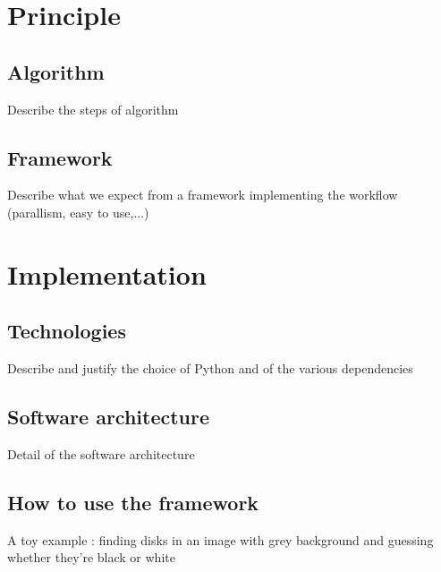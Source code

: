 \section{Principle}
\subsection{Algorithm}
Describe the steps of algorithm  
\subsection{Framework}
Describe what we expect from a framework implementing the workflow (parallism, easy to use,...) 
\section{Implementation}
\subsection{Technologies}
Describe and justify the choice of Python and of the various dependencies
\subsection{Software architecture}
Detail of the software architecture
\subsection{How to use the framework}
A toy example : finding disks in an image with grey background and guessing whether they're black or white 